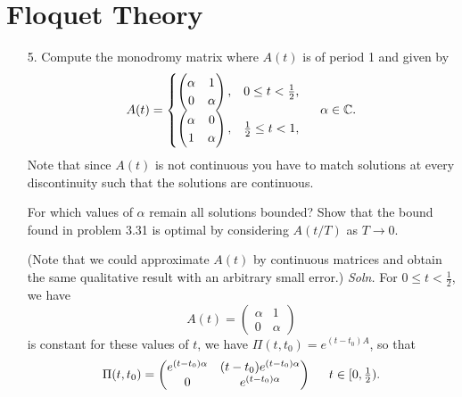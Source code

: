 \documentclass{article}
\begin{document}
\section*{Floquet Theory}
\begin{itemize}
    \item[5.] Compute the monodromy matrix where $A(t)$ is of period 1 and given by
    \[A(t) = \begin{cases}
        \begin{pmatrix}
            \alpha & 1\\
            0 & \alpha
        \end{pmatrix}, & 0 \leq t < \frac{1}{2},\\
        \begin{pmatrix}
            \alpha & 0\\
            1 & \alpha
        \end{pmatrix}, & \frac{1}{2}\leq t < 1,
    \end{cases} \hspace{0.5cm} \alpha \in \mathbb{C}.\]
    Note that since $A(t)$ is not continuous you have to match solutions at every discontinuity such that the solutions are continuous. 
    

    
    For which values of $\alpha$ remain all solutions bounded? Show that the bound found in problem 3.31 is optimal by considering $A(t/T)$ as $T \to 0$.
    

    
    (Note that we could approximate $A(t)$ by continuous matrices and obtain the same qualitative result with an arbitrary small error.)
    \newline\newline
    \textit{Soln.} For $0\leq t < \tfrac{1}{2}$, we have 
    \[A(t) = \begin{pmatrix}
        \alpha & 1\\
        0 & \alpha
    \end{pmatrix}\]
    is constant for these values of $t$, we have $\Pi(t,t_0) = e^{(t - t_0)A}$, so that 
    \[\Pi(t,t_0) = \begin{pmatrix}
        e^{(t - t_0)\alpha} & (t-t_0)e^{(t - t_0)\alpha}\\
        0 & e^{(t - t_0)\alpha}
    \end{pmatrix} \hspace{0.5cm} t \in [0, \tfrac{1}{2}).\]
    

\end{itemize}
\end{document}
